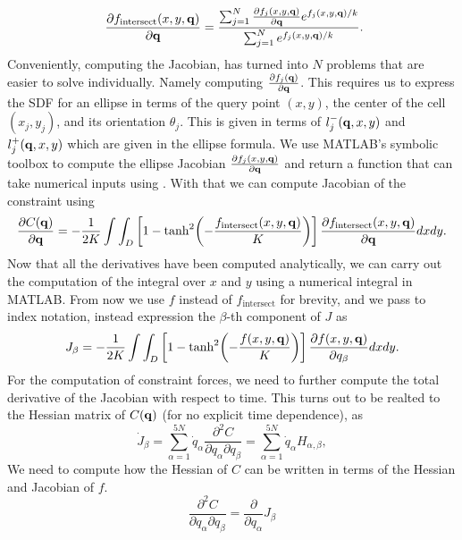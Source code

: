 \begin{equation*}\
\pdv{f_{\textrm{intersect}}(x,y,\vb{q})}{\vb{q}} = \frac{ \sum_{j=1}^N \pdv{f_j(x,y,\vb{q})}{\vb{q}}e^{f_j(x,y,\vb{q})/k}}{ \sum_{j=1}^N e^{f_j(x,y,\vb{q})/k}}.
\end{equation*}
Conveniently, computing the Jacobian, has turned into $N$ problems that are easier to solve individually. Namely computing $\pdv{f_j(\vb{q})}{\vb{q}}$.
This requires us to express the SDF for an ellipse in terms of the query point $(x,y)$, the center of the cell $(x_j,y_j)$, and its orientation $\theta_j$. This
is given in terms of $l_j^-(\vb{q}, x, y)$ and $l_j^+(\vb{q}, x, y)$ which are given in the ellipse formula. We use MATLAB's symbolic toolbox to compute the
ellipse Jacobian $\pdv{f_j(x,y,\vb{q})}{\vb{q}}$ and return a function that can take numerical inputs using .
With that we can compute Jacobian of the constraint using
\begin{equation} 
    \pdv{C(\vb{q})}{\vb{q}} = -\frac{1}{2K} \int \int_D \left[ 1- \tanh[2]( -\frac{f_{\textrm{intersect}}(x,y,\vb{q})}{K}) \right] \pdv{f_{\textrm{intersect}}(x,y,\vb{q})}{\vb{q}} dx dy.
\end{equation}
Now that all the derivatives have been computed analytically, we can carry out the computation of the integral over $x$ and $y$ using a numerical integral in MATLAB.
From now we use $f$ instead of $f_{\textrm{intersect}}$ for brevity, and we pass to index notation, instead expression the $\beta$-th component of $J$ as 
\begin{equation}
J_{\beta} = -\frac{1}{2K} \int \int_D \left[ 1- \tanh[2]( -\frac{f(x,y,\vb{q})}{K}) \right] \pdv{f(x,y,\vb{q})}{q_{\beta}} dx dy.
\end{equation}
For the computation of constraint forces, we need to further compute the total derivative of the Jacobian with respect to time. This turns 
out to be realted to the Hessian matrix of $C(\vb{q})$ (for no explicit time dependence), as 
\begin{equation*}
    \dot{J}_{\beta} = \sum_{\alpha = 1}^{5N} \dot{q}_{\alpha} \frac{\partial^2 C}{ \partial q_{\alpha} \partial q_{\beta}} = \sum_{\alpha = 1}^{5N} \dot{q}_{\alpha} H_{\alpha, \beta},
\end{equation*}
We need to compute how the Hessian of $C$ can be written in terms of the Hessian and Jacobian of $f$.
\begin{equation}
    \frac{\partial^2 C}{ \partial q_{\alpha} \partial q_{\beta}} = \frac{\partial }{\partial q_{\alpha}} J_{\beta}
\end{equation}

